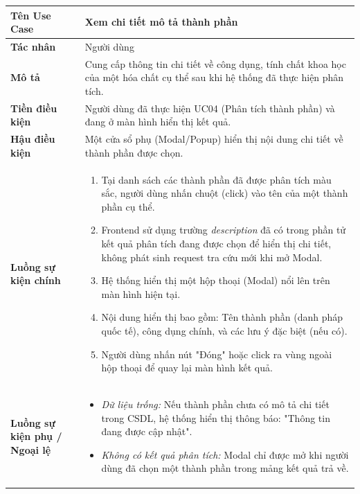 \documentclass[12pt,a4paper]{article}
\begin{document}
\begin{center}
\renewcommand{\arraystretch}{1.4}
\begin{tabular}{|p{4cm}|p{10cm}|}
\hline
\rowcolor{blue!15}
\textbf{Tên Use Case} & \textbf{Xem chi tiết mô tả thành phần} \\ \hline
\textbf{Tác nhân} & Người dùng \\ \hline
\textbf{Mô tả} & Cung cấp thông tin chi tiết về công dụng, tính chất khoa học của một hóa chất cụ thể sau khi hệ thống đã thực hiện phân tích. \\ \hline
\textbf{Tiền điều kiện} & Người dùng đã thực hiện UC04 (Phân tích thành phần) và đang ở màn hình hiển thị kết quả. \\ \hline
\textbf{Hậu điều kiện} & Một cửa sổ phụ (Modal/Popup) hiển thị nội dung chi tiết về thành phần được chọn. \\ \hline
\textbf{Luồng sự kiện chính} & 
\begin{enumerate}
    \item Tại danh sách các thành phần đã được phân tích màu sắc, người dùng nhấn chuột (click) vào tên của một thành phần cụ thể.
    \item Frontend sử dụng trường \textit{description} đã có trong phần tử kết quả phân tích đang được chọn để hiển thị chi tiết, không phát sinh request tra cứu mới khi mở Modal.
    \item Hệ thống hiển thị một hộp thoại (Modal) nổi lên trên màn hình hiện tại.
    \item Nội dung hiển thị bao gồm: Tên thành phần (danh pháp quốc tế), công dụng chính, và các lưu ý đặc biệt (nếu có).
    \item Người dùng nhấn nút "Đóng" hoặc click ra vùng ngoài hộp thoại để quay lại màn hình kết quả.
\end{enumerate} \\ \hline
\textbf{Luồng sự kiện phụ / Ngoại lệ} & 
\begin{itemize}
    \item \textit{Dữ liệu trống:} Nếu thành phần chưa có mô tả chi tiết trong CSDL, hệ thống hiển thị thông báo: "Thông tin đang được cập nhật".
    \item \textit{Không có kết quả phân tích:} Modal chỉ được mở khi người dùng đã chọn một thành phần trong mảng kết quả trả về.
\end{itemize} \\ \hline
\end{tabular}
\end{center}
\end{document}

